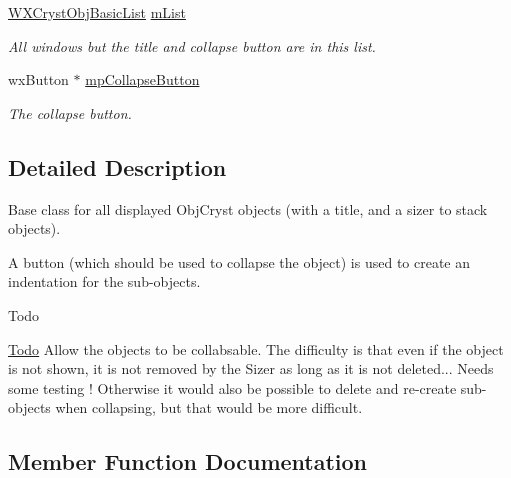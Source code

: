 \begin{DoxyCompactItemize}
\mbox{\label{class_obj_cryst_1_1_w_x_cryst_obj_a2ec7c27e1a75da178e402c6166301126}} 
\mbox{\hyperlink{class_obj_cryst_1_1_w_x_cryst_obj_basic_list}{W\+X\+Cryst\+Obj\+Basic\+List}} \mbox{\hyperlink{class_obj_cryst_1_1_w_x_cryst_obj_a2ec7c27e1a75da178e402c6166301126}{m\+List}}
\begin{DoxyCompactList}\small\item\em All windows but the title and collapse button are in this list. \end{DoxyCompactList}\item 
\mbox{\label{class_obj_cryst_1_1_w_x_cryst_obj_abdcafc600137d8c8603dc5af76476eea}} 
wx\+Button $\ast$ \mbox{\hyperlink{class_obj_cryst_1_1_w_x_cryst_obj_abdcafc600137d8c8603dc5af76476eea}{mp\+Collapse\+Button}}
\begin{DoxyCompactList}\small\item\em The collapse button. \end{DoxyCompactList}\end{DoxyCompactItemize}


\subsection{Detailed Description}
Base class for all displayed Obj\+Cryst objects (with a title, and a sizer to stack objects).

A button (which should be used to collapse the object) is used to create an indentation for the sub-\/objects.

\begin{DoxyRefDesc}{Todo}
\item[\mbox{\hyperlink{todo__todo000001}{Todo}}]Allow the objects to be collabsable. The difficulty is that even if the object is not shown, it is not removed by the Sizer as long as it is not deleted... Needs some testing ! Otherwise it would also be possible to delete and re-\/create sub-\/objects when collapsing, but that would be more difficult. \end{DoxyRefDesc}


\subsection{Member Function Documentation}
\mbox{\label{class_obj_cryst_1_1_w_x_cryst_obj_a2d79799836e2138925a55b66601bbfe3}} 
